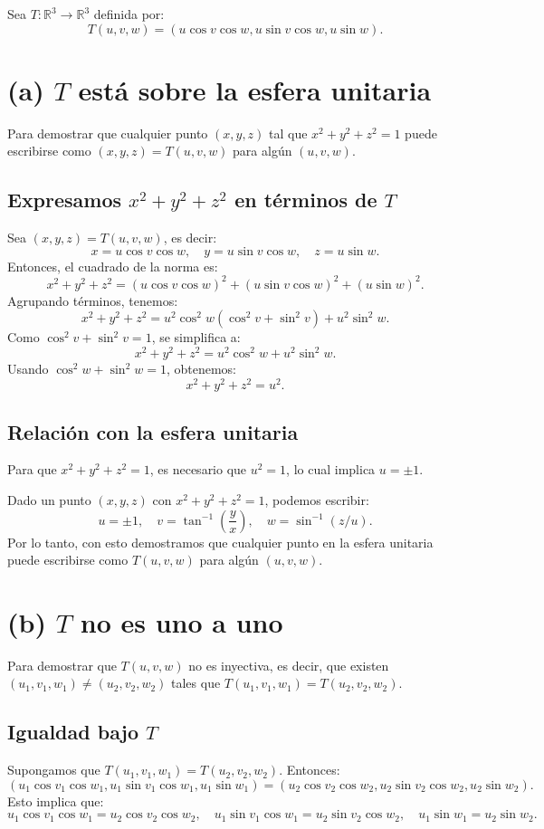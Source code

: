 Sea \( T : \mathbb{R}^3 \to \mathbb{R}^3 \) definida por:
\[
T(u, v, w) = (u \cos v \cos w, u \sin v \cos w, u \sin w).
\]

\section*{(a) \( T \) está sobre la esfera unitaria}
Para demostrar que cualquier punto \( (x, y, z) \) tal que \( x^2 + y^2 + z^2 = 1 \) puede escribirse como \( (x, y, z) = T(u, v, w) \) para algún \( (u, v, w) \).

\subsection*{Expresamos \( x^2 + y^2 + z^2 \) en términos de \( T \)}
Sea \( (x, y, z) = T(u, v, w) \), es decir:
\[
x = u \cos v \cos w, \quad y = u \sin v \cos w, \quad z = u \sin w.
\]
Entonces, el cuadrado de la norma es:
\[
x^2 + y^2 + z^2 = (u \cos v \cos w)^2 + (u \sin v \cos w)^2 + (u \sin w)^2.
\]
Agrupando términos, tenemos:
\[
x^2 + y^2 + z^2 = u^2 \cos^2 w (\cos^2 v + \sin^2 v) + u^2 \sin^2 w.
\]
Como \( \cos^2 v + \sin^2 v = 1 \), se simplifica a:
\[
x^2 + y^2 + z^2 = u^2 \cos^2 w + u^2 \sin^2 w.
\]
Usando \( \cos^2 w + \sin^2 w = 1 \), obtenemos:
\[
x^2 + y^2 + z^2 = u^2.
\]

\subsection*{Relación con la esfera unitaria}
Para que \( x^2 + y^2 + z^2 = 1 \), es necesario que \( u^2 = 1 \), lo cual implica \( u = \pm 1 \). 

Dado un punto \( (x, y, z) \) con \( x^2 + y^2 + z^2 = 1 \), podemos escribir:
\[
u = \pm 1, \quad v = \tan^{-1}\left(\frac{y}{x}\right), \quad w = \sin^{-1}(z/u).
\]
Por lo tanto, con esto demostramos que cualquier punto en la esfera unitaria puede escribirse como \( T(u, v, w) \) para algún \( (u, v, w) \).

\section*{(b) \( T \) no es uno a uno}
Para demostrar que \( T(u, v, w) \) no es inyectiva, es decir, que existen \( (u_1, v_1, w_1) \neq (u_2, v_2, w_2) \) tales que \( T(u_1, v_1, w_1) = T(u_2, v_2, w_2) \).

\subsection*{Igualdad bajo \( T \)}
Supongamos que \( T(u_1, v_1, w_1) = T(u_2, v_2, w_2) \). Entonces:
\[
(u_1 \cos v_1 \cos w_1, u_1 \sin v_1 \cos w_1, u_1 \sin w_1) = (u_2 \cos v_2 \cos w_2, u_2 \sin v_2 \cos w_2, u_2 \sin w_2).
\]
Esto implica que:
\[
u_1 \cos v_1 \cos w_1 = u_2 \cos v_2 \cos w_2, \quad
u_1 \sin v_1 \cos w_1 = u_2 \sin v_2 \cos w_2, \quad
u_1 \sin w_1 = u_2 \sin w_2.
\]

